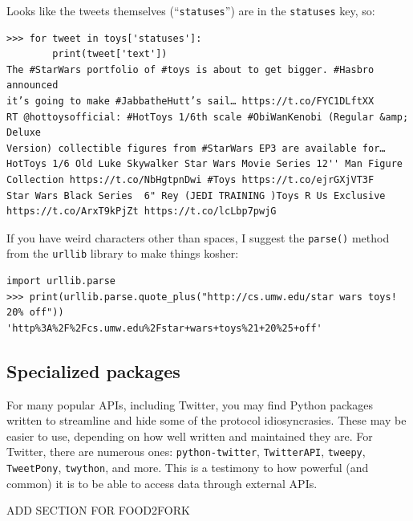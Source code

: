 \documentclass[12pt]{article}
\begin{document}
Looks like the tweets themselves (``\texttt{statuses}'') are in the
\texttt{statuses} key, so:

\small
\begin{Verbatim}[fontsize=\small,samepage=true,frame=none]
>>> for tweet in toys['statuses']:
        print(tweet['text'])
The #StarWars portfolio of #toys is about to get bigger. #Hasbro announced
it’s going to make #JabbatheHutt’s sail… https://t.co/FYC1DLftXX
RT @hottoysofficial: #HotToys 1/6th scale #ObiWanKenobi (Regular &amp; Deluxe
Version) collectible figures from #StarWars EP3 are available for…
HotToys 1/6 Old Luke Skywalker Star Wars Movie Series 12'' Man Figure
Collection https://t.co/NbHgtpnDwi #Toys https://t.co/ejrGXjVT3F
Star Wars Black Series  6" Rey (JEDI TRAINING )Toys R Us Exclusive
https://t.co/ArxT9kPjZt https://t.co/lcLbp7pwjG
\end{Verbatim}
\normalsize


If you have weird characters other than spaces, I suggest the \texttt{parse()}
method from the \texttt{urllib} library to make things kosher:

\begin{Verbatim}[fontsize=\small,samepage=true,frame=none]
import urllib.parse
>>> print(urllib.parse.quote_plus("http://cs.umw.edu/star wars toys! 20% off"))
'http%3A%2F%2Fcs.umw.edu%2Fstar+wars+toys%21+20%25+off'
\end{Verbatim}


\subsection{Specialized packages}

For many popular APIs, including Twitter, you may find Python packages written
to streamline and hide some of the protocol idiosyncrasies. These may be
easier to use, depending on how well written and maintained they are. For
Twitter, there are numerous ones: \texttt{python-twitter},
\texttt{TwitterAPI}, \texttt{tweepy}, \texttt{TweetPony}, \texttt{twython},
and more. This is a testimony to how powerful (and common) it is to be able to
access data through external APIs.

ADD SECTION FOR FOOD2FORK
\end{document}
